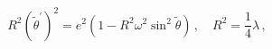 \begin{equation}
\label{xx}
R^2 \left(\tilde{\theta}^\prime\right)^2 = e^2 \left( 1 - R^2 \omega^2 \sin^2\tilde{\theta}\right)\,,
\quad R^2= \frac{1}{4} \lambda\,,
\end{equation}

